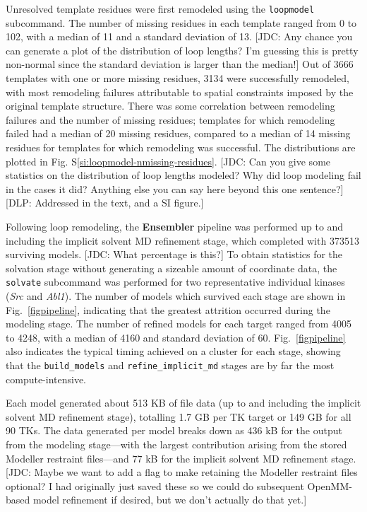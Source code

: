 \documentclass[aps,pre,twocolumn,nofootinbib,superscriptaddress,linenumbers]{revtex4-1}
\begin{document}
Unresolved template residues were first remodeled using the {\tt loopmodel} subcommand.
The number of missing residues in each template ranged from 0 to 102, with a median of 11 and a standard deviation of 13.
{\color{red}[JDC: Any chance you can generate a plot of the distribution of loop lengths?  I'm guessing this is pretty non-normal since the standard deviation is larger than the median!]}
Out of 3666 templates with one or more missing residues, 3134 were successfully remodeled, with most remodeling failures attributable to spatial constraints imposed by the original template structure.
There was some correlation between remodeling failures and the number of missing residues; templates for which remodeling failed had a median of 20 missing residues, compared to a median of 14 missing residues for templates for which remodeling was successful.
The distributions are plotted in Fig. S\ref{si:loopmodel-nmissing-residues}.
{\color{red}[JDC: Can you give some statistics on the distribution of loop lengths modeled?  Why did loop modeling fail in the cases it did?  Anything else you can say here beyond this one sentence?]}
{\color{blue}[DLP: Addressed in the text, and a SI figure.]}

Following loop remodeling, the {\bf Ensembler} pipeline was performed up to and including the implicit solvent MD refinement stage, which completed with \num{373513} surviving models.
{\color{red}[JDC: What percentage is this?]}
To obtain statistics for the solvation stage without generating a sizeable amount of coordinate data, the {\tt solvate} subcommand was performed for two representative individual kinases (\emph{Src} and \emph{Abl1}).
The number of models which survived each stage are shown in Fig.~\ref{figpipeline}, indicating that the greatest attrition occurred during the modeling stage.
The number of refined models for each target ranged from 4005 to 4248, with a median of 4160 and standard deviation of 60.
Fig.~\ref{figpipeline} also indicates the typical timing achieved on a cluster for each stage, showing that the {\tt build\_models} and {\tt refine\_implicit\_md} stages are by far the most compute-intensive.

Each model generated about 513 KB of file data (up to and including the implicit solvent MD refinement stage), totalling 1.7 GB per TK target or 149 GB for all 90 TKs.
The data generated per model breaks down as 436 kB for the output from the modeling stage---with the largest contribution arising from the stored Modeller restraint files---and 77 kB for the implicit solvent MD refinement stage.
{\color{red}[JDC: Maybe we want to add a flag to make retaining the Modeller restraint files optional?  I had originally just saved these so we could do subsequent OpenMM-based model refinement if desired, but we don't actually do that yet.]}
\end{document}
